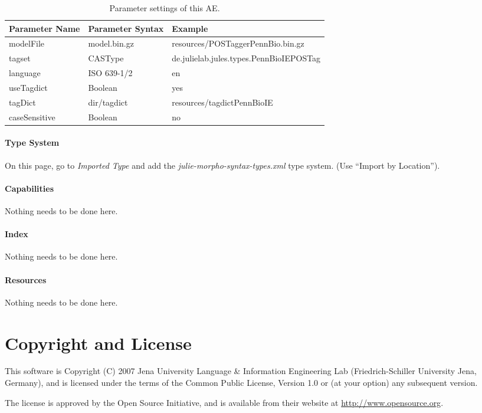 \documentclass[11pt,a4paper,halfparskip]{scrartcl}
\begin{document}
\begin{table}[h!]
  \centering
  \begin{tabular}{|p{4cm}|p{4cm}|p{7cm}|}
    \hline
    Parameter Name & Parameter Syntax & Example \\
    \hline\hline
    modelFile & model.bin.gz & resources/POSTaggerPennBio.bin.gz\\
    tagset & CASType & de.julielab.jules.types.PennBioIEPOSTag \\
    language & ISO 639-1/2 & en \\
    useTagdict & Boolean & yes \\
    tagDict & dir/tagdict & resources/tagdictPennBioIE\\
   caseSensitive & Boolean & no \\
  \hline
  \end{tabular}
  \caption{Parameter settings of this AE.}
  \label{tab:param_settings}
\end{table}

\paragraph{Type System}
\label{sss:type_system}
On this page, go to \emph{Imported Type} and add the \emph{julie-morpho-syntax-types.xml} type system. (Use ``Import by Location'').


\paragraph{Capabilities}
Nothing needs to be done here.


\paragraph{Index}
Nothing needs to be done here.

\paragraph{Resources}
Nothing needs to be done here.


\section{Copyright and License}
This software is Copyright (C) 2007 Jena University Language \& Information
Engineering Lab (Friedrich-Schiller University Jena, Germany), and is
licensed under the terms of the Common Public License, Version 1.0 or (at
your option) any subsequent version.

The license is approved by the Open Source Initiative, and is
available from their website at \url{http://www.opensource.org}.



\end{document}
